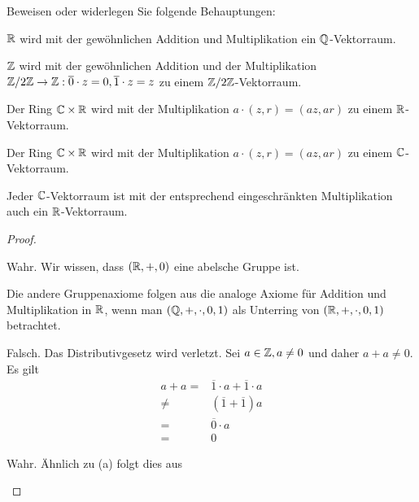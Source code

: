 \begin{Problem}
	Beweisen oder widerlegen Sie folgende Behauptungen:
	\begin{parts}
	\item $\mathbb{R}$ wird mit der gewöhnlichen Addition und Multiplikation ein $\mathbb{Q}$-Vektorraum.
	\item $\mathbb{Z}$ wird mit der gewöhnlichen Addition und der Multiplikation $\mathbb{Z} / 2\mathbb{Z} \to \mathbb{Z}: \overline{0}\cdot z=0,\overline{1}\cdot z=z$ zu einem $\mathbb{Z} / 2\mathbb{Z}$-Vektorraum.
	\item Der Ring $\mathbb{C}\times \mathbb{R}$ wird mit der Multiplikation $a\cdot (z, r)=(az,ar)$ zu einem $\mathbb{R}$-Vektorraum.
	\item Der Ring $\mathbb{C}\times \mathbb{R}$ wird mit der Multiplikation $a\cdot (z, r)=(az, ar)$ zu einem $\mathbb{C}$-Vektorraum.
	\item Jeder $\mathbb{C}$-Vektorraum ist mit der entsprechend eingeschränkten Multiplikation auch ein $\mathbb{R}$-Vektorraum.
	\end{parts}
\end{Problem}
\begin{proof}
	\begin{parts}
	\item Wahr. Wir wissen, dass $(\mathbb{R},+,0)$ eine abelsche Gruppe ist. 

		Die andere Gruppenaxiome folgen aus die analoge Axiome f\"{u}r Addition und Multiplikation in $\mathbb{R}$, wenn man $(\mathbb{Q},+,\cdot, 0, 1)$ als Unterring von $(\mathbb{R},+,\cdot, 0, 1)$ betrachtet.
	\item Falsch. Das Distributivgesetz wird verletzt. Sei $a\in \mathbb{Z}, a\neq 0$ und daher $a+a\neq 0$. Es gilt
		\begin{align*}
			a+a=&\overline{1}\cdot a+\overline{1}\cdot a\\
			\neq& (\overline{1}+\overline{1})a\\
			=& \overline{0}\cdot a\\
			=& 0
		\end{align*}
	\item Wahr. Ähnlich zu (a) folgt dies aus 
	\end{parts}
\end{proof}
